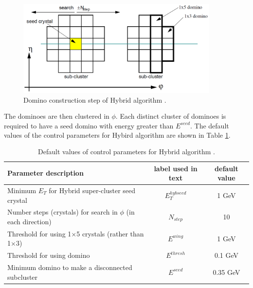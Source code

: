 \begin{figure}[h!]
\begin{center}
\includegraphics[width=0.9\textwidth]{figures/Reconstruction/Electron_photon/Hybrid.png}
\caption{Domino construction step of Hybrid algorithm \cite{CMS-Note-2001-034}.}
\label{fig:Cluster_Hybrid}
\end{center}
\end{figure}

The dominoes are then clustered in $\phi$. Each distinct cluster of dominoes is required to have a seed domino with energy greater than $E^{seed}$. The default values of the control parameters for Hybird algorithm are shown in Table \ref{tab:Hybrid_parameters}.

\begin{table}[htp]
\caption{Default values of control parameters for Hybrid algorithm .\label{tab:Hybrid_parameters}}
\begin{center}
  \begin{tabular}{|l|c|c|}
    \hline
    Parameter description                                            & label used in text& default value  \\  \hline\hline
    Minimum $E_{T}$ for Hybrid super-cluster seed crystal            & $E_{T}^{hybseed}$ & 1 GeV \\  \hline
    Number steps (crystals) for search in $\phi$ (in each direction) & $N_{step}$        & 10     \\ \hline
    Threshold for using 1$\times$5 crystals (rather than 1$\times$3) & $E^{wing}$        & 1 GeV  \\ \hline
    Threshold for using domino                                       & $E^{thresh}$      & 0.1 GeV  \\ \hline
    Minimum domino to make a disconnected subcluster                 & $E^{seed}$        & 0.35 GeV \\ \hline
  \end{tabular}
\end{center}
\end{table}





